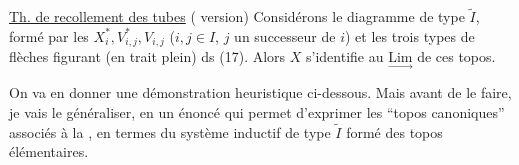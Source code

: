 \uline{Th. de recollement des tubes} ( version) Considérons le diagramme de type $\widetilde I$, formé par les $X_i^*,V_{i,j}^*,V_{i,j}$ ($i,j\in I$, $j$ un successeur de $i$) et les trois types de flèches  figurant (en trait plein) ds (17). Alors $X$ s'identifie au   $\underset{\longrightarrow}{\mathrm{Lim}}$ de ces topos.



On va en donner une démonstration heuristique ci-dessous. Mais avant de le faire, je vais le généraliser, en un énoncé qui permet d'exprimer  les ``topos canoniques'' associés à la , en termes du système inductif de type $\widetilde I$ formé des topos élémentaires.

